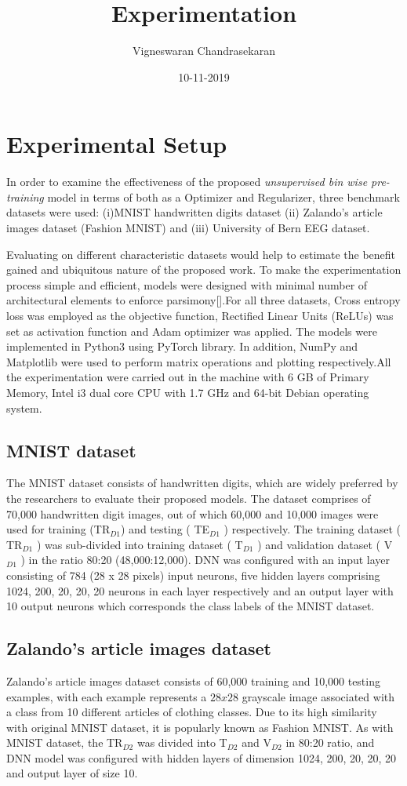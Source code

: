 \documentclass{article}
\title{Experimentation}
\author{Vigneswaran Chandrasekaran}
\date{10-11-2019}
\begin{document}
\section{Experimental Setup}
\justify
In order to examine the effectiveness of the proposed \textit{unsupervised bin wise pre-training}
model in terms of both as a Optimizer and Regularizer, three benchmark datasets were used:
(i)MNIST handwritten digits dataset (ii) Zalando's article images dataset (Fashion MNIST) and (iii) University of Bern EEG dataset.

Evaluating on different characteristic datasets would help to estimate the benefit gained and ubiquitous nature of the proposed work. To make the experimentation process simple and efficient, models were designed with minimal number of architectural elements to enforce parsimony[].For all three datasets, Cross entropy loss was employed as the objective function, Rectified Linear Units (ReLUs) was set as activation function and Adam optimizer was applied. The models were implemented in Python3 using PyTorch library. In addition, NumPy and Matplotlib were used to perform matrix operations and plotting respectively.All the experimentation were carried out in the machine with 6 GB of Primary Memory, Intel i3 dual core CPU with 1.7 GHz and 64-bit Debian operating system.

\subsection{MNIST dataset}
The MNIST dataset consists of handwritten digits, which are widely preferred
by the researchers to evaluate their proposed models. The dataset comprises of 70,000
handwritten digit images, out of which 60,000 and 10,000 images were used for training
(TR$_{D1}$) and testing ( TE$_{D1}$ ) respectively. The training dataset ( TR$_{D1}$ ) was sub-divided into
training dataset ( T$_{D1}$ ) and validation dataset ( V$_{D1}$ ) in the ratio 80:20 (48,000:12,000). DNN
was configured with an input layer consisting of 784 (28 x 28 pixels) input neurons, five
hidden layers comprising 1024, 200, 20, 20, 20 neurons in each layer respectively and an
output layer with 10 output neurons which corresponds the class labels of the MNIST dataset.

\subsection{Zalando's article images dataset}
Zalando's article images dataset consists of 60,000 training and 10,000 testing examples, with each example represents a $28x28$ grayscale image associated with a class from 10 different articles of clothing classes. Due to its high similarity with original MNIST dataset, it is popularly known as Fashion MNIST. As with MNIST dataset, the TR$_{D2}$ was divided into T$_{D2}$ and V$_{D2}$ in 80:20 ratio, and DNN model was configured with hidden layers of dimension 1024, 200, 20, 20, 20 and output layer of size 10.
\end{document}
